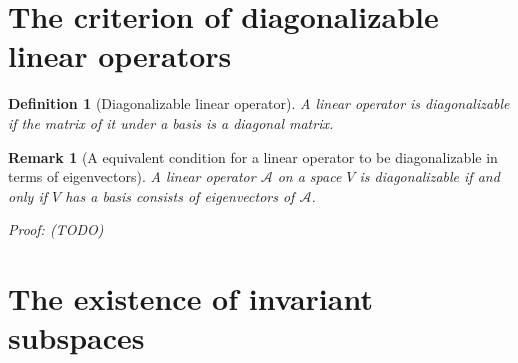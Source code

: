 \documentclass[onecolumn]{ctexart}
\newtheorem{definition}{Definition}
\newtheorem{remark}{Remark}
\begin{document}
\section{The criterion of diagonalizable linear operators}

\begin{definition}[Diagonalizable linear operator]
  A linear operator is diagonalizable if the matrix of it under a basis is a diagonal matrix.
\end{definition}
\begin{remark}[A equivalent condition for a linear operator to be diagonalizable in terms of eigenvectors]
  A linear operator $\mathcal{A}$ on a space $V$ is diagonalizable if and only 
  if $V$ has a basis consists of eigenvectors of $\mathcal{A}$.

  Proof: (TODO)
\end{remark}

\section{The existence of invariant subspaces}
\end{document}
